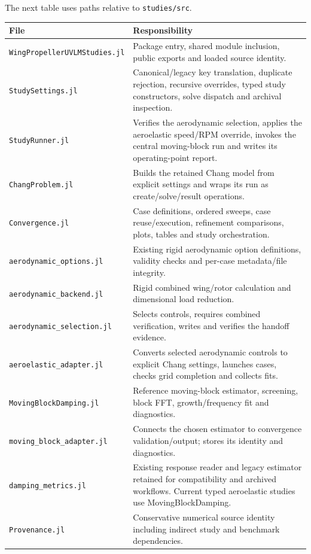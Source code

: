 \documentclass[11pt,a4paper]{article}
\newcommand{\code}{\nolinkurl}
\begin{document}
The next table uses paths relative to \code{studies/src}.
\begin{longtable}{@{}L{.35\linewidth}L{.57\linewidth}@{}}
\toprule File & Responsibility\\\midrule\endhead
\code{WingPropellerUVLMStudies.jl} & Package entry, shared module inclusion, public exports and loaded source identity.\\
\code{StudySettings.jl} & Canonical/legacy key translation, duplicate rejection, recursive overrides, typed study constructors, solve dispatch and archival inspection.\\
\code{StudyRunner.jl} & Verifies the aerodynamic selection, applies the aeroelastic speed/RPM override, invokes the central moving-block run and writes its operating-point report.\\
\code{ChangProblem.jl} & Builds the retained Chang model from explicit settings and wraps its run as create/solve/result operations.\\
\code{Convergence.jl} & Case definitions, ordered sweeps, case reuse/execution, refinement comparisons, plots, tables and study orchestration.\\
\code{aerodynamic_options.jl} & Existing rigid aerodynamic option definitions, validity checks and per-case metadata/file integrity.\\
\code{aerodynamic_backend.jl} & Rigid combined wing/rotor calculation and dimensional load reduction.\\
\code{aerodynamic_selection.jl} & Selects controls, requires combined verification, writes and verifies the handoff evidence.\\
\code{aeroelastic_adapter.jl} & Converts selected aerodynamic controls to explicit Chang settings, launches cases, checks grid completion and collects fits.\\
\code{MovingBlockDamping.jl} & Reference moving-block estimator, screening, block FFT, growth/frequency fit and diagnostics.\\
\code{moving_block_adapter.jl} & Connects the chosen estimator to convergence validation/output; stores its identity and diagnostics.\\
\code{damping_metrics.jl} & Existing response reader and legacy estimator retained for compatibility and archived workflows. Current typed aeroelastic studies use MovingBlockDamping.\\
\code{Provenance.jl} & Conservative numerical source identity including indirect study and benchmark dependencies.\\
\bottomrule
\end{longtable}
\end{document}
